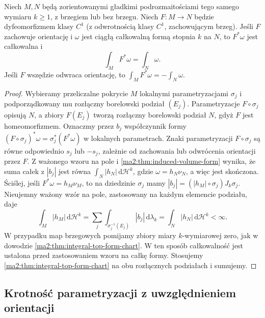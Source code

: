\begin{wniosek}
\label{ma2:cor:top-form-diffeomorphism}
Niech $M,N$ będą zorientowanymi gładkimi
podrozmaitościami tego samego wymiaru $k\ge1$,
z brzegiem lub bez brzegu. Niech $F:M\to N$
będzie dyfeomorfizmem klasy $C^1$ (z odwrotnością
klasy $C^1$, zachowującym brzeg).
Jeśli $F$ zachowuje orientację i $\omega$
jest ciągłą całkowalną formą stopnia $k$ na $N$,
to $F^*\omega$ jest całkowalna i
\[
 \int_M F^*\omega=\int_N\omega.
\]
Jeśli $F$ wszędzie odwraca orientację, to
$\int_M F^*\omega=-\int_N\omega$.
\end{wniosek}
\begin{proof}
Wybieramy przeliczalne pokrycie $M$ lokalnymi
parametryzacjami $\sigma_j$ i podporządkowany
mu rozłączny borelowski podział $(E_j)$.
Parametryzacje $F\circ\sigma_j$ opisują $N$,
a zbiory $F(E_j)$ tworzą rozłączny borelowski
podział $N$, gdyż $F$ jest homeomorfizmem.
Oznaczmy przez $b_j$ współczynnik formy
$(F\circ\sigma_j)^*\omega=\sigma_j^*(F^*\omega)$
w lokalnych parametrach. Znaki parametryzacji
$F\circ\sigma_j$ są równe odpowiednio
$s_j$ lub $-s_j$, zależnie od zachowania
lub odwrócenia orientacji przez $F$.
Z ważonego wzoru na pole i
\ref{ma2:thm:induced-volume-form} wynika, że
suma całek z $|b_j|$ jest równa
$\int_N |h_N|\,\mathrm d\mathcal H^k$,
gdzie $\omega=h_N\nu_N$, a więc jest skończona.
Ściślej, jeśli $F^*\omega=h_M\nu_M$, to
na dziedzinie $\sigma_j$ mamy
$|b_j|=(|h_M|\circ\sigma_j)J_k\sigma_j$.
Nieujemny ważony wzór na pole, zastosowany
na każdym elemencie podziału, daje
\[
 \int_M |h_M|\,\mathrm d\mathcal H^k
 =\sum_j\int_{\sigma_j^{-1}(E_j)}
 |b_j|\,\mathrm d\lambda_k
 =\int_N |h_N|\,\mathrm d\mathcal H^k<\infty.
\]
W przypadku map brzegowych pomijamy zbiory
miary $k$-wymiarowej zero, jak w dowodzie
\ref{ma2:thm:integral-top-form-chart}.
W ten sposób całkowalność jest ustalona
przed zastosowaniem wzoru na całkę formy.
Stosujemy \ref{ma2:thm:integral-top-form-chart}
na obu rozłącznych podziałach i sumujemy.
\end{proof}

\subsection{Krotność parametryzacji z uwzględnieniem orientacji}

